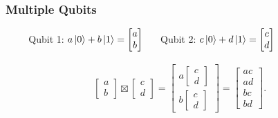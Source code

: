 \documentclass{beamer}
\theoremstyle{definition}
\begin{document}
\begin{frame}
\frametitle{Multiple Qubits}
\pause
$\hspace{1cm}$Qubit 1: $a\left\vert{0}\right\rangle + b\left\vert{1}\right\rangle = \begin{bmatrix} a\\b \end{bmatrix} \hspace{0.5cm}$ Qubit 2: $c\left\vert{0}\right\rangle + d\left\vert{1}\right\rangle = \begin{bmatrix}
c\\d
\end{bmatrix}$




\pause
\begin{align*}
\begin{bmatrix}
a\\b
\end{bmatrix}
\boxtimes
\begin{bmatrix}
c\\d
\end{bmatrix} = \begin{bmatrix}
a\begin{bmatrix}
c\\d
\end{bmatrix}\\
b\begin{bmatrix}
c\\d
\end{bmatrix}
\end{bmatrix}
=
\begin{bmatrix}
ac\\ad\\bc\\bd
\end{bmatrix}.
\end{align*}
\end{frame}
\end{document}
